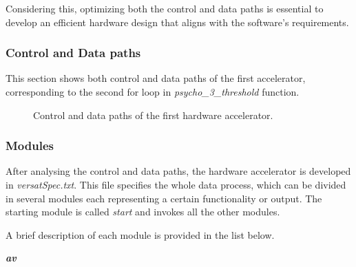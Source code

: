 \documentclass{article}
\begin{document}
Considering this, optimizing both the control and data paths is essential to develop an efficient hardware design that aligns with the software's requirements.

\subsubsection{Control and Data paths}
This section shows both control and data paths of the first accelerator, corresponding to the second for loop in \textit{psycho\_3\_threshold} function.

\begin{figure}[H]
\centerline{}
\caption{Control and data paths of the first hardware accelerator.}
\label{data1}
\end{figure}

\subsubsection{Modules}
After analysing the control and data paths, the hardware accelerator is developed in \textit{versatSpec.txt}. This file specifies the whole data process, which can be divided in several modules each representing a certain functionality or output. The starting module is called \textit{start} and invokes all the other modules.

A brief description of each module is provided in the list below.

\vspace{0.5cm}

\textit{\textbf{av}}
\end{document}
